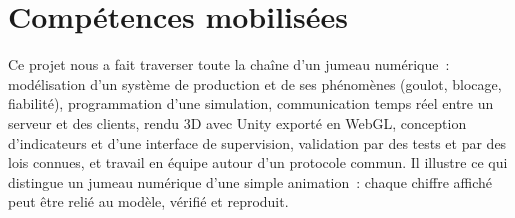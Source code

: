 \section{Compétences mobilisées}

Ce projet nous a fait traverser toute la chaîne d'un jumeau numérique~: modélisation d'un système de production et de ses phénomènes (goulot, blocage, fiabilité), programmation d'une simulation, communication temps réel entre un serveur et des clients, rendu \ac{3D} avec Unity exporté en WebGL, conception d'indicateurs et d'une interface de supervision, validation par des tests et par des lois connues, et travail en équipe autour d'un protocole commun. Il illustre ce qui distingue un jumeau numérique d'une simple animation~: chaque chiffre affiché peut être relié au modèle, vérifié et reproduit.
